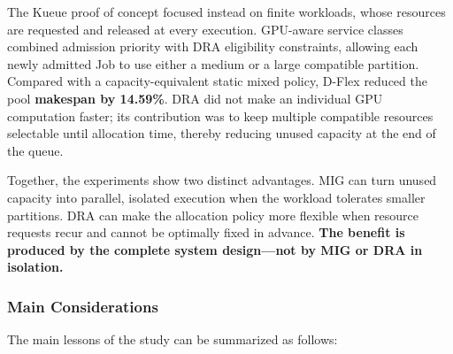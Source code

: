 The Kueue proof of concept focused instead on finite workloads, whose resources are requested and released at every execution. GPU-aware service classes combined admission priority with DRA eligibility constraints, allowing each newly admitted Job to use either a medium or a large compatible partition. Compared with a capacity-equivalent static mixed policy, D-Flex reduced the pool \textbf{makespan by 14.59\%}. DRA did not make an individual GPU computation faster; its contribution was to keep multiple compatible resources selectable until allocation time, thereby reducing unused capacity at the end of the queue.

Together, the experiments show two distinct advantages. MIG can turn unused capacity into parallel, isolated execution when the workload tolerates smaller partitions. DRA can make the allocation policy more flexible when resource requests recur and cannot be optimally fixed in advance. \textbf{The benefit is produced by the complete system design---not by MIG or DRA in isolation.}

\subsubsection*{Main Considerations}

The main lessons of the study can be summarized as follows:

